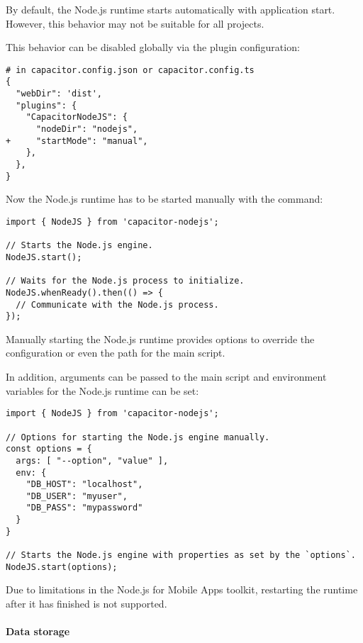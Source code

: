 By default, the Node.js runtime starts automatically with application start.
However, this behavior may not be suitable for all projects. 

This behavior can be disabled globally via the  plugin configuration:

\begin{verbatim}
# in capacitor.config.json or capacitor.config.ts
{
  "webDir": 'dist',
  "plugins": {
    "CapacitorNodeJS": {
      "nodeDir": "nodejs",
+     "startMode": "manual",
    },
  },
} 
\end{verbatim}

Now the Node.js runtime has to be started manually with the  command:

\begin{verbatim}
import { NodeJS } from 'capacitor-nodejs';

// Starts the Node.js engine.
NodeJS.start();

// Waits for the Node.js process to initialize.
NodeJS.whenReady().then(() => {
  // Communicate with the Node.js process.
});
\end{verbatim}

Manually starting the Node.js runtime provides options to override the  configuration or even the path for the main script.

In addition, arguments can be passed to the main script and environment variables for the Node.js runtime can be set:

\begin{verbatim}
import { NodeJS } from 'capacitor-nodejs';

// Options for starting the Node.js engine manually.
const options = {
  args: [ "--option", "value" ],
  env: {
    "DB_HOST": "localhost",
    "DB_USER": "myuser",
    "DB_PASS": "mypassword"
  }
}

// Starts the Node.js engine with properties as set by the `options`.
NodeJS.start(options);
\end{verbatim}

\begin{note}[Note]
  Due to limitations in the Node.js for Mobile Apps toolkit, restarting the runtime after it has finished is not supported.
  \cite{nodejs-mobile:docs}
\end{note}

\newpage

\paragraph{Data storage}
\label{sec:Capacitor-NodeJS:DataStorage}

